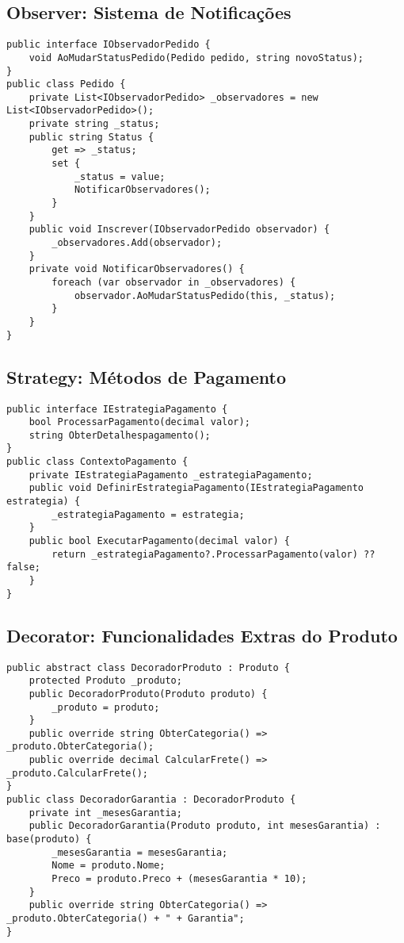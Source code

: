 \documentclass[
    12pt,
    oneside,
    a4paper,
    english,
    brazil,
]{abntex2}
\begin{document}
\subsection{Observer: Sistema de Notificações}
\begin{lstlisting}[caption={Observer para notificações de pedido}]
public interface IObservadorPedido {
    void AoMudarStatusPedido(Pedido pedido, string novoStatus);
}
public class Pedido {
    private List<IObservadorPedido> _observadores = new List<IObservadorPedido>();
    private string _status;
    public string Status {
        get => _status;
        set {
            _status = value;
            NotificarObservadores();
        }
    }
    public void Inscrever(IObservadorPedido observador) {
        _observadores.Add(observador);
    }
    private void NotificarObservadores() {
        foreach (var observador in _observadores) {
            observador.AoMudarStatusPedido(this, _status);
        }
    }
}
\end{lstlisting}

\subsection{Strategy: Métodos de Pagamento}
\begin{lstlisting}[caption={Strategy para métodos de pagamento}]
public interface IEstrategiaPagamento {
    bool ProcessarPagamento(decimal valor);
    string ObterDetalhespagamento();
}
public class ContextoPagamento {
    private IEstrategiaPagamento _estrategiaPagamento;
    public void DefinirEstrategiaPagamento(IEstrategiaPagamento estrategia) {
        _estrategiaPagamento = estrategia;
    }
    public bool ExecutarPagamento(decimal valor) {
        return _estrategiaPagamento?.ProcessarPagamento(valor) ?? false;
    }
}
\end{lstlisting}

\subsection{Decorator: Funcionalidades Extras do Produto}
\begin{lstlisting}[caption={Decorator para produtos}]
public abstract class DecoradorProduto : Produto {
    protected Produto _produto;
    public DecoradorProduto(Produto produto) {
        _produto = produto;
    }
    public override string ObterCategoria() => _produto.ObterCategoria();
    public override decimal CalcularFrete() => _produto.CalcularFrete();
}
public class DecoradorGarantia : DecoradorProduto {
    private int _mesesGarantia;
    public DecoradorGarantia(Produto produto, int mesesGarantia) : base(produto) {
        _mesesGarantia = mesesGarantia;
        Nome = produto.Nome;
        Preco = produto.Preco + (mesesGarantia * 10);
    }
    public override string ObterCategoria() => _produto.ObterCategoria() + " + Garantia";
}
\end{lstlisting}
\end{document}
